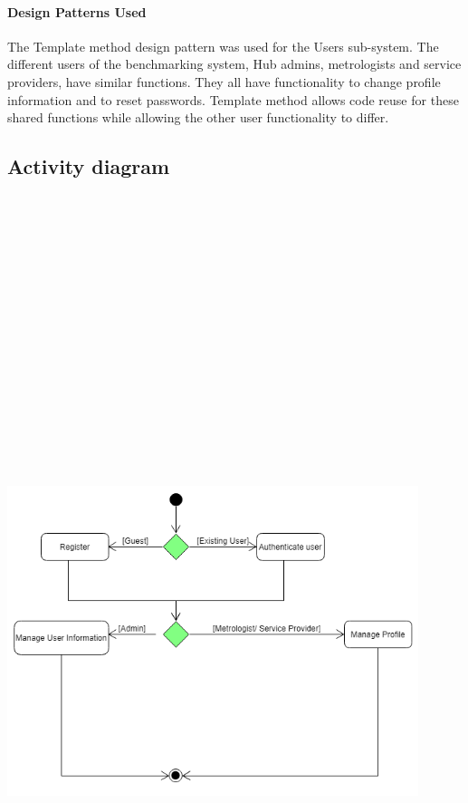 \paragraph{Design Patterns Used} \linebreak 
The Template method design pattern was used for the Users sub-system. The different users of the benchmarking system, Hub admins, metrologists and service providers, have similar functions. They all have functionality to change profile information and to reset passwords. Template method allows code reuse for these shared functions while allowing the other user functionality to differ.
	
		
\subsection{Activity diagram}
    \includegraphics[width=12cm,height=26cm,keepaspectratio]{users_unit/Images/users activity diagram.png}
